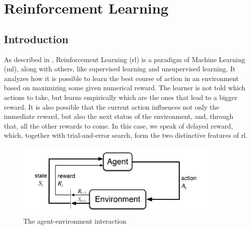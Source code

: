 \chapter{Reinforcement Learning} %

\section{Introduction}


As described in \cite{SuttonBarto}, Reinforcement Learning (\acrshort{rl}) is a paradigm of Machine Learning (\acrshort{ml}), along with others, like supervised learning and unsupervised learning. It analyzes how it is possible to learn the best course of action in an environment based on maximizing some given numerical reward. The learner is not told which actions to take, but learns empirically which are the ones that lead to a bigger reward. It is also possible that the current action influences not only the immediate reward, but also the next status of the environment, and, through that, all the other rewards to come. In this case, we speak of delayed reward, which, together with trial-and-error search, form the two distinctive features of \acrshort{rl}.

\begin{figure}[ht]
    \centering
    \includegraphics[width=0.9\textwidth]{chapters/figures/MDP-diagram.png}
    \caption{The agent-environment interaction \cite{SuttonBarto}}
    \label{fig:MDP}
\end{figure}

